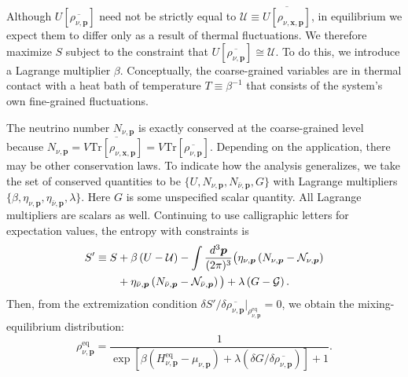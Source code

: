 \documentclass[aps,prd,twocolumn,groupedaddress,preprintnumbers]{revtex4-2}
\begin{document}
Although $U[\overline{\rho_{\nu,\boldsymbol{p}}}]$ need not be strictly equal to $\mathcal{U} \equiv \overline{U[\rho_{\nu,\boldsymbol{x},\boldsymbol{p}}]}$, in equilibrium we expect them to differ only as a result of thermal fluctuations. We therefore maximize $S$ subject to the constraint that $U[\overline{\rho_{\nu,\boldsymbol{p}}}] \cong \mathcal{U}$. To do this, we introduce a Lagrange multiplier $\beta$. Conceptually, the coarse-grained variables are in thermal contact with a heat bath of temperature $T \equiv \beta^{-1}$ that consists of the system's own fine-grained fluctuations.

The neutrino number $N_{\nu,\boldsymbol{p}}$ is exactly conserved at the coarse-grained level because $N_{\nu,\boldsymbol{p}} = V \overline{\textrm{Tr}\left[ \rho_{\nu,\boldsymbol{x},\boldsymbol{p}} \right]} = V \textrm{Tr}\left[ \overline{\rho_{\nu, \boldsymbol{p}}} \right]$. Depending on the application, there may be other conservation laws. To indicate how the analysis generalizes, we take the set of conserved quantities to be $\lbrace U, N_{\nu,\boldsymbol{p}}, N_{\bar{\nu},\boldsymbol{p}}, G \rbrace$ with Lagrange multipliers $\lbrace \beta, \eta_{\nu,\boldsymbol{p}}, \eta_{\bar{\nu},\boldsymbol{p}}, \lambda \rbrace$. Here $G$ is some unspecified scalar quantity. All Lagrange multipliers are scalars as well. Continuing to use calligraphic letters for expectation values, the entropy with constraints is
\begin{align}
S' \equiv S &+ \beta \left( U - \mathcal{U} \right) - \int \frac{d^3 \boldsymbol{p}}{(2\pi)^3} \big( \eta_{\nu,\boldsymbol{p}} \left( N_{\nu,\boldsymbol{p}} - \mathcal{N}_{\nu,\boldsymbol{p}} \right) \notag \\
&+ \eta_{\bar{\nu},\boldsymbol{p}} \left( N_{\bar{\nu},\boldsymbol{p}} - \mathcal{N}_{\bar{\nu},\boldsymbol{p}} \right) \big) + \lambda \left( G - \mathcal{G} \right).
\end{align}
Then, from the extremization condition $\delta S' / \delta \overline{\rho_{\nu,\boldsymbol{p}}}|_{\rho^\textrm{eq}_{\nu,\boldsymbol{p}}} = 0$, we obtain the mixing-equilibrium distribution:
\begin{equation}
\rho^\textrm{eq}_{\nu,\boldsymbol{p}} = \frac{1}{\exp \left[ \beta \left( H^\textrm{eq}_{\nu,\boldsymbol{p}} - \mu_{\nu,\boldsymbol{p}}  \right) + \lambda \left( \delta G / \delta \overline{\rho_{\nu,\boldsymbol{p}}} \right) \right] + 1}. \label{eq:rhoeq}
\end{equation}
\end{document}
